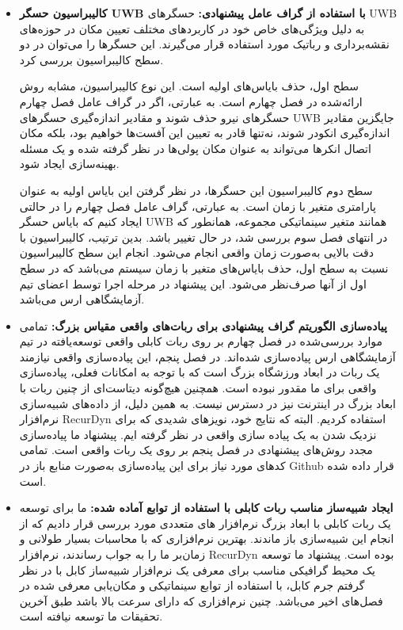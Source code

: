 \begin{itemize}
\item \textbf{کالیبراسیون حسگر UWB با استفاده از گراف عامل پیشنهادی:} 
حسگرهای UWB به دلیل ویژگی‌های خاص خود در کاربردهای مختلف تعیین مکان در حوزه‌های نقشه‌برداری و رباتیک مورد استفاده قرار می‌گیرند. این حسگرها را می‌توان در دو سطح کالیبراسیون بررسی کرد.

سطح اول، حذف بایاس‌های اولیه است. این نوع کالیبراسیون، مشابه روش ارائه‌شده در فصل چهارم است. به عبارتی، اگر در گراف عامل فصل چهارم حسگرهای نیرو حذف شوند و مقادیر اندازه‌گیری حسگرهای UWB جایگزین مقادیر اندازه‌گیری انکودر شوند، نه‌تنها قادر به تعیین این آفست‌ها خواهیم بود، بلکه مکان اتصال انکرها می‌تواند به عنوان مکان پولی‌ها در نظر گرفته شده و یک مسئله بهینه‌سازی ایجاد شود.

سطح دوم کالیبراسیون این حسگرها، در نظر گرفتن این بایاس اولیه به عنوان پارامتری متغیر با زمان است. به عبارتی، گراف عامل فصل چهارم را در حالتی ایجاد کنیم که بایاس حسگر UWB همانند متغیر سینماتیکی مجموعه، همانطور که در انتهای فصل سوم بررسی شد، در حال تغییر باشد. بدین ترتیب، کالیبراسیون با دقت بالایی به‌صورت زمان واقعی انجام می‌شود. انجام این سطح کالیبراسیون نسبت به سطح اول، حذف بایاس‌های متغیر با زمان سیستم می‌باشد که در سطح اول از آنها صرف‌نظر می‌شود. این پیشنهاد در مرحله اجرا توسط اعضای تیم آزمایشگاهی ارس می‌باشد.


\item \textbf{پیاده‌سازی الگوریتم گراف پیشنهادی برای ربات‌های واقعی مقیاس بزرگ:} 
تمامی موارد بررسی‌شده در فصل چهارم بر روی ربات کابلی واقعی توسعه‌یافته در تیم آزمایشگاهی ارس پیاده‌سازی شده‌اند. در فصل پنجم، این پیاده‌سازی واقعی نیازمند یک ربات در ابعاد ورزشگاه بزرگ است که با توجه به امکانات فعلی، پیاده‌سازی واقعی برای ما مقدور نبوده است. همچنین هیچ‌گونه دیتاست‌ای از چنین ربات با ابعاد بزرگ در اینترنت نیز در دسترس نیست. به همین دلیل، از داده‌های شبیه‌سازی نرم‌افزار RecurDyn استفاده کردیم. البته که نتایج خود، نویزهای شدیدی که برای نزدیک شدن به یک پیاده سازی واقعی در نظر گرفته ایم. پیشنهاد ما پیاده‌سازی مجدد روش‌های پیشنهادی در فصل پنجم بر روی یک ربات واقعی است. تمامی کدهای مورد نیاز برای این پیاده‌سازی به‌صورت منابع باز در Github قرار داده شده است.

\item \textbf{ایجاد شبیه‌ساز مناسب ربات کابلی با استفاده از توابع آماده شده:} 
ما برای توسعه یک ربات کابلی با ابعاد بزرگ نرم‌افزار های متعددی مورد بررسی قرار دادیم که از انجام این شبیه‌سازی باز ماندند. بهترین نرم‌افزاری که با محاسبات بسیار طولانی و زمان‌بر ما را به جواب رساندند، نرم‌افزار RecurDyn بوده است. پیشنهاد ما توسعه یک محیط گرافیکی مناسب برای معرفی یک نرم‌افزار شبیه‌ساز کابل با در نظر گرفتم جرم کابل، با استفاده از توابع سینماتیکی و مکان‌یابی معرفی شده در فصل‌های اخیر می‌باشد. چنین نرم‌افزاری که دارای سرعت بالا باشد طبق آخرین تحقیقات ما توسعه نیافته است.


\end{itemize}
